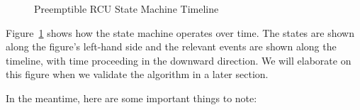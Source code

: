\begin{figure}[htb]
\begin{center}
\end{center}
\caption{Preemptible RCU State Machine Timeline}
\label{app:rcuimpl:Preemptible RCU State Machine Timeline}
\end{figure}

Figure~\ref{app:rcuimpl:Preemptible RCU State Machine Timeline}
shows how the state machine operates over time.
The states are shown along the figure's left-hand side and the relevant events
are shown along the timeline, with time proceeding in the downward direction.
We will elaborate on this figure when we validate the algorithm in
a later section.

In the meantime, here are some important things to note:

